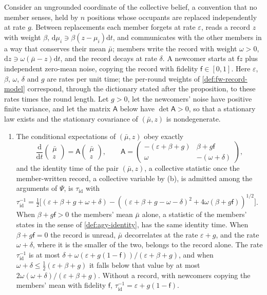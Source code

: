 \begin{proposition}\label{prop:agy-identity}
Consider an ungrounded coordinate of the collective belief, a convention that no member senses, held by $n$ positions whose occupants are replaced independently at rate $g$. Between replacements each member forgets at rate $\varepsilon$, reads a record $z$ with weight $\beta$, $\mathrm d\mu_i\ni\beta(z-\mu_i)\mathrm dt$, and communicates with the other members in a way that conserves their mean $\bar\mu$; members write the record with weight $\omega>0$, $\mathrm dz\ni\omega(\bar\mu-z)\mathrm dt$, and the record decays at rate $\delta$. A newcomer starts at $\mathsf fz$ plus independent zero-mean noise, copying the record with fidelity $\mathsf f\in[0,1]$. Here $\varepsilon$, $\beta$, $\omega$, $\delta$ and $g$ are rates per unit time; the per-round weights of \cref{def:fw-record-model} correspond, through the dictionary stated after the proposition, to these rates times the round length. Let $g>0$, let the newcomers' noise have positive finite variance, and let the matrix $\mathsf A$ below have $\det\mathsf A>0$, so that a stationary law exists and the stationary covariance of $(\bar\mu,z)$ is nondegenerate.
\begin{enumerate}
\item[(a)] The conditional expectations of $(\bar\mu,z)$ obey exactly
\begin{equation}\label{eq:agy-identity}
\frac{\mathrm d}{\mathrm dt}\begin{pmatrix}\bar\mu\\z\end{pmatrix}=\mathsf A\begin{pmatrix}\bar\mu\\z\end{pmatrix},\qquad\mathsf A=\begin{pmatrix}-(\varepsilon+\beta+g)&\beta+g\mathsf f\\\omega&-(\omega+\delta)\end{pmatrix},
\end{equation}
and the identity time of the pair $(\bar\mu,z)$, a collective statistic once the member-written record, a collective variable by (b), is admitted among the arguments of $\Psi$, is $\tau_{\mathrm{id}}$ with $\tau_{\mathrm{id}}^{-1}=\frac12\bigl[(\varepsilon+\beta+g+\omega+\delta)-((\varepsilon+\beta+g-\omega-\delta)^2+4\omega(\beta+g\mathsf f))^{1/2}\bigr]$. When $\beta+g\mathsf f>0$ the members' mean $\bar\mu$ alone, a statistic of the members' states in the sense of \cref{def:agy-identity}, has the same identity time. When $\beta+g\mathsf f=0$ the record is unread, $\bar\mu$ decorrelates at the rate $\varepsilon+g$, and the rate $\omega+\delta$, where it is the smaller of the two, belongs to the record alone. The rate $\tau_{\mathrm{id}}^{-1}$ is at most $\delta+\omega(\varepsilon+g(1-\mathsf f))/(\varepsilon+\beta+g)$, and when $\omega+\delta\le\frac12(\varepsilon+\beta+g)$ it falls below that value by at most $2\omega(\omega+\delta)/(\varepsilon+\beta+g)$. Without a record, with newcomers copying the members' mean with fidelity $\mathsf f$, $\tau_{\mathrm{id}}^{-1}=\varepsilon+g(1-\mathsf f)$.

\end{enumerate}
\end{proposition}
